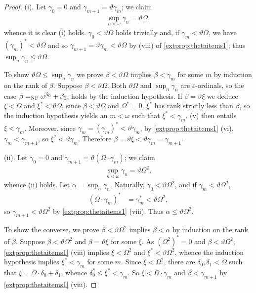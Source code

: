 \documentclass[UKenglish,cleveref,DIV=12]{scrartcl}
\theoremstyle{definition}
\theoremstyle{definition}
\begin{document}
\begin{proof}
(i). Let $\gamma_0=0$ and $\gamma_{m+1}=\vartheta\gamma_m$; we claim
\begin{align*}
 \sup_{n<\omega}\gamma_n=\vartheta\Omega,
\end{align*}
whence it is clear (i) holds. $\gamma_0<\vartheta\Omega$ holds trivially and, if $\gamma_m<\vartheta\Omega$, we have $(\gamma_m)^*<\vartheta\Omega$ and so $\gamma_{m+1}=\vartheta\gamma_m<\vartheta\Omega$ by (viii) of \cref{extprop:thetaitems1}; thus $\sup_{n}\gamma_n\le\vartheta\Omega$.

To show $\vartheta\Omega\le\sup_n\gamma_n$ we prove $\beta<\vartheta\Omega$
implies $\beta<\gamma_m$ for some $m$ by induction on the rank of $\beta$. Suppose $\beta<\vartheta\Omega$. Both
$\vartheta\Omega$ and $\sup_n\gamma_n$ are $\varepsilon$-ordinals, so the case
$\beta=_{\mathrm{NF}}\omega^{\beta_0}+\beta_1$, holds by the induction hypothesis. If
$\beta=\vartheta\xi$ we deduce $\xi<\Omega$ and $\xi^*<\vartheta\Omega$, since
$\beta<\vartheta\Omega$ and $\Omega^*=0$. $\xi^*$ has rank strictly less than
$\beta$, so the induction hypothesis yields an $m<\omega$ such that
$\xi^*<\gamma_m$.  (v) then entails $\xi<\gamma_m$.
Moreover, since $\gamma_m=(\gamma_m)^*<\vartheta\gamma_m$, by \cref{extprop:thetaitems1} (vi), $\gamma_m<\gamma_{m+1}$, so $\xi^*<\vartheta\gamma_{m}$. Therefore $\beta=\vartheta\xi<\vartheta\gamma_m=\gamma_{m+1}$.

(ii). Let $\gamma_0=0$ and $\gamma_{m+1}=\vartheta(\Omega\cdot\gamma_m)$; we claim
\begin{align*}
 \sup_{n<\omega}\gamma_n=\vartheta\Omega^2,
\end{align*}
whence (ii) holds.
Let $\alpha=\sup_n\gamma_n$. Naturally, $\gamma_0< \vartheta\Omega^2$, and if $\gamma_m<\vartheta\Omega^2$,
\begin{align*}
 (\Omega\cdot\gamma_m)^* %
	&=\gamma_m^*<\vartheta\Omega^2,
\end{align*}
so $\gamma_{m+1}<\vartheta\Omega^2$ by \cref{extprop:thetaitems1} (viii). Thus $\alpha\le\vartheta\Omega^2$.

To show the converse, we prove $\beta<\vartheta\Omega^2$ implies $\beta<\alpha$ by induction on the rank of $\beta$. Suppose $\beta<\vartheta\Omega^2$ and $\beta=\vartheta\xi$
for some $\xi$. As $(\Omega^2)^*=0$ and $\beta<\vartheta\Omega^2$,
\cref{extprop:thetaitems1} (viii) implies $\xi<\Omega^2$ and
$\xi^*<\vartheta\Omega^2$, whence the induction hypothesis implies
$\xi^*<\gamma_m$ for some $m$. Since $\xi<\Omega^2$, there are $\delta_0,\delta_1<\Omega$ such that $\xi=\Omega\cdot\delta_0+\delta_1$, whence $\delta_0^*\le\xi^*<\gamma_m$. So $\xi<\Omega\cdot\gamma_m$
and $\beta<\gamma_{m+1}$ by \cref{extprop:thetaitems1} (viii).


\end{proof}
\end{document}
